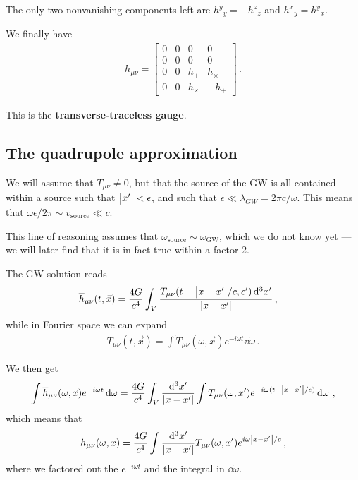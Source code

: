 \documentclass[main.tex]{subfiles}
\begin{document}
The only two nonvanishing components left are \(h^{y}{}_{y} = - h^{z}{}_z\) and \(h^{x}{}_{y} = h^{y}{}_{x}\). 

We finally have 
%
\begin{align}
h_{\mu \nu } = \left[\begin{array}{cccc}
0 & 0 & 0 & 0 \\ 
0 & 0 & 0 & 0 \\ 
0 & 0 & h_{+} & h_{\times } \\ 
0 & 0 & h_{\times } & -h_{+}
\end{array}\right]
\,.
\end{align}

This is the \textbf{transverse-traceless gauge}.

\subsection{The quadrupole approximation}

We will assume that \(T_{\mu \nu } \neq 0\), but that the source of the GW is all contained within a source such that \(\abs{x'} < \epsilon\), and such that \(\epsilon \ll \lambda_{GW} = 2 \pi c / \omega \). 
This means that \(\omega \epsilon / 2 \pi \sim v _{\text{source}} \ll c\). 

This line of reasoning assumes that \(\omega _{\text{source}} \sim \omega _{\text{GW}} \), which we do not know yet --- we will later find that it is in fact true within a factor 2.

The GW solution reads 
%
\begin{align}
\overline{h}_{\mu \nu }(t, \vec{x}) &= \frac{4 G}{c^{4}}
\int_{V} \frac{T_{\mu \nu } (t - \abs{x - x'} / c, c') \dd[3]{x'}}{\abs{x - x'}}
\,,
\end{align}
%
while in Fourier space we can expand 
%
\begin{align}
T_{\mu \nu } (t, \vec{x}) = \int \widetilde{T}_{\mu \nu } (\omega , \vec{x}) e^{-i \omega t} \dd{\omega }
\,.
\end{align}

We then get 
%
\begin{align}
\int \overline{h}_{\mu \nu } (\omega , \vec{x}) e^{-i \omega t} \dd{\omega } = \frac{4 G}{c^{4}} 
\int_{V} \frac{ \dd[3]{x'}}{\abs{x - x'}} \int T_{\mu \nu } (\omega , x') e^{-i \omega (t - \abs{x-x'} / c) } \dd{\omega }
\,,
\end{align}
%
which means that 
%
\begin{align}
h_{\mu \nu } (\omega , x) = \frac{4G}{c^{4}} \int 
\frac{\dd[3]{x'}}{\abs{x - x'}}
T_{\mu \nu }(\omega , x') e^{i \omega \abs{x-x'} / c}
\,,
\end{align}
%
where we factored out the \(e^{- i \omega t}\) and the integral in \(\dd{\omega }\). 
\end{document}
